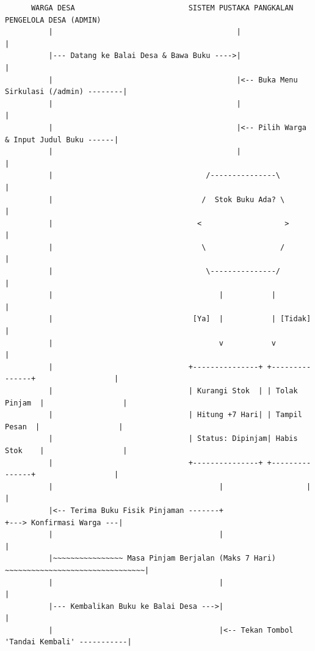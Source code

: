 \documentclass[
  indonesian,
  12pt,
]{report}
\begin{document}
\begin{verbatim}
      WARGA DESA                          SISTEM PUSTAKA PANGKALAN                  PENGELOLA DESA (ADMIN)
          |                                          |                                         |
          |--- Datang ke Balai Desa & Bawa Buku ---->|                                         |
          |                                          |<-- Buka Menu Sirkulasi (/admin) --------|
          |                                          |                                         |
          |                                          |<-- Pilih Warga & Input Judul Buku ------|
          |                                          |                                         |
          |                                   /---------------\                               |
          |                                  /  Stok Buku Ada? \                              |
          |                                 <                   >                              |
          |                                  \                 /                               |
          |                                   \---------------/                                |
          |                                      |           |                                 |
          |                                [Ya]  |           | [Tidak]                         |
          |                                      v           v                                 |
          |                               +---------------+ +---------------+                  |
          |                               | Kurangi Stok  | | Tolak Pinjam  |                  |
          |                               | Hitung +7 Hari| | Tampil Pesan  |                  |
          |                               | Status: Dipinjam| Habis Stok    |                  |
          |                               +---------------+ +---------------+                  |
          |                                      |                   |                         |
          |<-- Terima Buku Fisik Pinjaman -------+                   +---> Konfirmasi Warga ---|
          |                                      |                                             |
          |~~~~~~~~~~~~~~~~ Masa Pinjam Berjalan (Maks 7 Hari) ~~~~~~~~~~~~~~~~~~~~~~~~~~~~~~~~|
          |                                      |                                             |
          |--- Kembalikan Buku ke Balai Desa --->|                                             |
          |                                      |<-- Tekan Tombol 'Tandai Kembali' -----------|

\end{verbatim}
\end{document}
